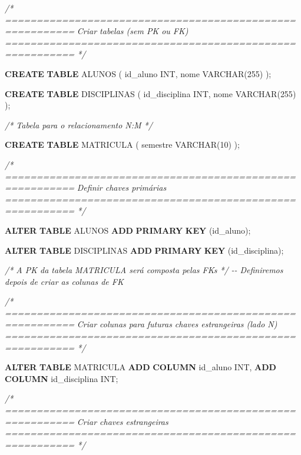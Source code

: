 \documentclass[
]{book}
\newenvironment{Shaded}{\begin{snugshade}}{\end{snugshade}}
\newcommand{\CommentTok}[1]{\textcolor[rgb]{0.56,0.35,0.01}{\textit{#1}}}
\newcommand{\DataTypeTok}[1]{\textcolor[rgb]{0.13,0.29,0.53}{#1}}
\newcommand{\DecValTok}[1]{\textcolor[rgb]{0.00,0.00,0.81}{#1}}
\newcommand{\KeywordTok}[1]{\textcolor[rgb]{0.13,0.29,0.53}{\textbf{#1}}}
\newcommand{\NormalTok}[1]{#1}
\begin{document}
\begin{Shaded}
\begin{Highlighting}[]
\CommentTok{/* =========================================================}
\CommentTok{   Criar tabelas (sem PK ou FK)}
\CommentTok{   ========================================================= */}

\KeywordTok{CREATE} \KeywordTok{TABLE}\NormalTok{ ALUNOS }
\NormalTok{(}
\NormalTok{    id\_aluno }\DataTypeTok{INT}\NormalTok{,}
\NormalTok{    nome }\DataTypeTok{VARCHAR}\NormalTok{(}\DecValTok{255}\NormalTok{)}
\NormalTok{);}

\KeywordTok{CREATE} \KeywordTok{TABLE}\NormalTok{ DISCIPLINAS }
\NormalTok{(}
\NormalTok{    id\_disciplina }\DataTypeTok{INT}\NormalTok{,}
\NormalTok{    nome }\DataTypeTok{VARCHAR}\NormalTok{(}\DecValTok{255}\NormalTok{)}
\NormalTok{);}

\CommentTok{/* Tabela para o relacionamento N:M */}

\KeywordTok{CREATE} \KeywordTok{TABLE}\NormalTok{ MATRICULA }
\NormalTok{(}
\NormalTok{    semestre }\DataTypeTok{VARCHAR}\NormalTok{(}\DecValTok{10}\NormalTok{)}
\NormalTok{);}

\CommentTok{/* =========================================================}
\CommentTok{   Definir chaves primárias}
\CommentTok{   ========================================================= */}

\KeywordTok{ALTER} \KeywordTok{TABLE}\NormalTok{ ALUNOS  }\KeywordTok{ADD} \KeywordTok{PRIMARY} \KeywordTok{KEY}\NormalTok{ (id\_aluno);}

\KeywordTok{ALTER} \KeywordTok{TABLE}\NormalTok{ DISCIPLINAS }\KeywordTok{ADD} \KeywordTok{PRIMARY} \KeywordTok{KEY}\NormalTok{ (id\_disciplina);}

\CommentTok{/* A PK da tabela MATRICULA será composta pelas FKs */}
\CommentTok{{-}{-} Definiremos depois de criar as colunas de FK}

\CommentTok{/* =========================================================}
\CommentTok{   Criar colunas para futuras chaves estrangeiras (lado N)}
\CommentTok{   ========================================================= */}

\KeywordTok{ALTER} \KeywordTok{TABLE}\NormalTok{ MATRICULA }\KeywordTok{ADD} \KeywordTok{COLUMN}\NormalTok{ id\_aluno }\DataTypeTok{INT}\NormalTok{, }\KeywordTok{ADD} \KeywordTok{COLUMN}\NormalTok{ id\_disciplina }\DataTypeTok{INT}\NormalTok{;}

\CommentTok{/* =========================================================}
\CommentTok{   Criar chaves estrangeiras}
\CommentTok{   ========================================================= */}


\end{Highlighting}
\end{Shaded}
\end{document}

